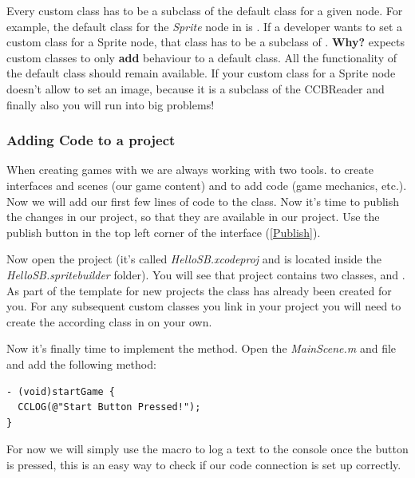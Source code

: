\begin{details}[frametitle={Requirements for Custom Classes}] 
Every custom class has to be a subclass of the default class for a given node.
For example, the default class for the \textit{Sprite} node in \SB{} is
\ccsprite{}. If a developer wants to set a custom class for a Sprite node, that
class has to be a subclass of \ccsprite{}. \textbf{Why?} \SB{} expects custom
classes to only \textbf{add} behaviour to a default class. All the functionality
of the default class should remain available. If your custom class for a Sprite
node doesn't allow \SB{} to set an image, because it is a subclass of \ccnode{}
the CCBReader and finally also you will run into big problems!
\end{details}

\subsubsection{Adding Code to a \SB{} project}
When creating games with \SB{} we are always working with two tools. \SB{} to
create interfaces and scenes (our game content) and \xcode{} to add code (game
mechanics, etc.). Now we will add our first few lines of code to the
 class. Now it's time to publish the changes in our \SB{}
project, so that they are available in our \xcode{} project. Use the publish
button in the top left corner of the \SB{} interface (\ref{Publish}). 

Now open the \xcode{} project (it's called \textit{HelloSB.xcodeproj} and is
located inside the \textit{HelloSB.spritebuilder} folder). You will see that
project contains two classes,  and
. As part of the template for new \SB{} projects the
 class has already been created for you. For any
subsequent custom classes you link in your \SB{} project you will need to create
the according class in \xcode{} on your own. 

Now it's finally time to implement the  method. Open the
\textit{MainScene.m} and file and add the following method:

\begin{lstlisting}
- (void)startGame {
  CCLOG(@"Start Button Pressed!");
}
\end{lstlisting} 

For now we will simply use the  macro to log a text to the
console once the button is pressed, this is an easy way to check if our code
connection is set up correctly.

